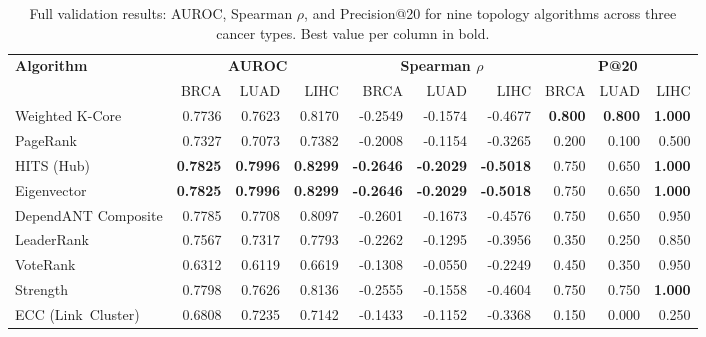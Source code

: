 \begin{table}[H]
\centering
\caption{Full validation results: AUROC, Spearman $\rho$, and Precision@20 for nine topology algorithms across three cancer types. Best value per column in bold.}
\label{tab:full_results}
\small
\begin{tabular}{lrrrrrrrrr}
\toprule
\multirow{2}{*}{\textbf{Algorithm}} & \multicolumn{3}{c}{\textbf{AUROC}} & \multicolumn{3}{c}{\textbf{Spearman $\rho$}} & \multicolumn{3}{c}{\textbf{P@20}} \\
\cmidrule(lr){2-4}\cmidrule(lr){5-7}\cmidrule(lr){8-10}
 & BRCA & LUAD & LIHC & BRCA & LUAD & LIHC & BRCA & LUAD & LIHC \\
\midrule
Weighted K-Core & 0.7736 & 0.7623 & 0.8170 & -0.2549 & -0.1574 & -0.4677 & \textbf{0.800} & \textbf{0.800} & \textbf{1.000} \\
PageRank & 0.7327 & 0.7073 & 0.7382 & -0.2008 & -0.1154 & -0.3265 & 0.200 & 0.100 & 0.500 \\
HITS \mbox{(Hub)} & \textbf{0.7825} & \textbf{0.7996} & \textbf{0.8299} & \textbf{-0.2646} & \textbf{-0.2029} & \textbf{-0.5018} & 0.750 & 0.650 & \textbf{1.000} \\
Eigenvector & \textbf{0.7825} & \textbf{0.7996} & \textbf{0.8299} & \textbf{-0.2646} & \textbf{-0.2029} & \textbf{-0.5018} & 0.750 & 0.650 & \textbf{1.000} \\
DependANT Composite & 0.7785 & 0.7708 & 0.8097 & -0.2601 & -0.1673 & -0.4576 & 0.750 & 0.650 & 0.950 \\
LeaderRank & 0.7567 & 0.7317 & 0.7793 & -0.2262 & -0.1295 & -0.3956 & 0.350 & 0.250 & 0.850 \\
VoteRank & 0.6312 & 0.6119 & 0.6619 & -0.1308 & -0.0550 & -0.2249 & 0.450 & 0.350 & 0.950 \\
Strength & 0.7798 & 0.7626 & 0.8136 & -0.2555 & -0.1558 & -0.4604 & 0.750 & 0.750 & \textbf{1.000} \\
ECC \mbox{(Link Cluster)} & 0.6808 & 0.7235 & 0.7142 & -0.1433 & -0.1152 & -0.3368 & 0.150 & 0.000 & 0.250 \\
\bottomrule
\end{tabular}
\end{table}